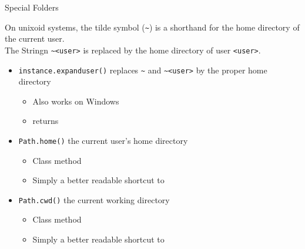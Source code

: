 \begin{frame}[fragile]{Special Folders}
%
\begin{hintbox}
\scriptsize
On unixoid systems, the tilde symbol (\texttt{\textasciitilde}) is a shorthand for the home directory of the current user.\\
The Stringn \texttt{\textasciitilde <user>} is replaced by the home directory of user \texttt{<user>}.
\end{hintbox}
%
\begin{itemize}
\item \texttt{instance.expanduser()} replaces \texttt{\textasciitilde} and \texttt{\textasciitilde <user>} by the proper home directory
	\begin{itemize}
	\item Also works on Windows
	\item {} returns 
	\end{itemize}
\item \texttt{Path.home()} the current user's home directory
	\begin{itemize}
	\item Class method
	\item Simply a better readable shortcut to 
	\end{itemize}
\item \texttt{Path.cwd()} the current working directory
	\begin{itemize}
	\item Class method
	\item Simply a better readable shortcut to 
	\end{itemize}
\end{itemize}
%
\end{frame}


